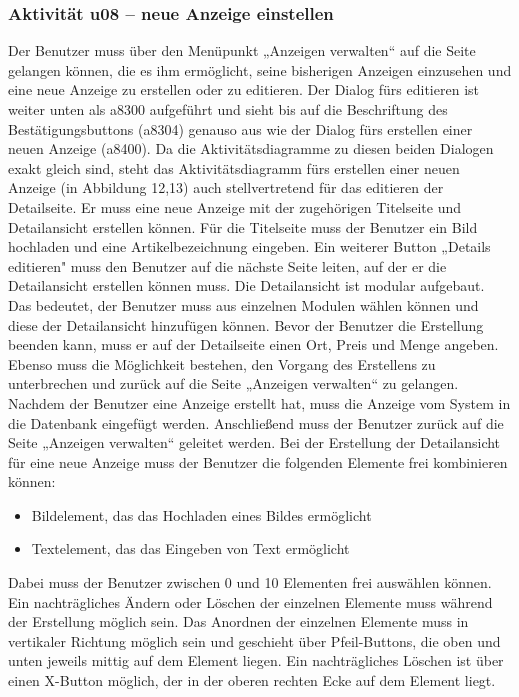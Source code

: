 \documentclass[a4paper,12pt,oneside]{scrartcl}
\begin{document}
\hypertarget{u08}{\subsubsection{Aktivität u08 – neue Anzeige einstellen}}
Der Benutzer muss über den Menüpunkt „Anzeigen verwalten“ auf die Seite gelangen können, die es ihm ermöglicht, seine bisherigen Anzeigen einzusehen und eine neue Anzeige zu erstellen oder zu editieren.
Der Dialog fürs editieren ist weiter unten als a8300 aufgeführt und sieht bis auf die Beschriftung des Bestätigungsbuttons (a8304) genauso aus wie der Dialog fürs erstellen einer neuen Anzeige (a8400). Da die Aktivitätsdiagramme zu diesen beiden Dialogen exakt gleich sind, steht das Aktivitätsdiagramm fürs erstellen einer neuen Anzeige (in Abbildung 12,13) auch stellvertretend für das editieren der Detailseite.
Er muss eine neue Anzeige mit der zugehörigen Titelseite und Detailansicht erstellen können.
Für die Titelseite muss der Benutzer ein Bild hochladen und eine Artikelbezeichnung eingeben.
Ein weiterer Button „Details editieren" muss den Benutzer auf die nächste Seite leiten, auf der er die Detailansicht erstellen können muss.
Die Detailansicht ist modular aufgebaut. Das bedeutet, der Benutzer muss aus einzelnen Modulen wählen können und diese der Detailansicht hinzufügen können.
Bevor der Benutzer die Erstellung beenden kann, muss er auf der Detailseite einen Ort, Preis und Menge angeben.
Ebenso muss die Möglichkeit bestehen, den Vorgang des Erstellens zu unterbrechen und zurück auf die Seite „Anzeigen verwalten“ zu gelangen.
Nachdem der Benutzer eine Anzeige erstellt hat, muss die Anzeige vom System in die Datenbank eingefügt werden.
Anschließend muss der Benutzer zurück auf die Seite „Anzeigen verwalten“ geleitet werden.
Bei der Erstellung der Detailansicht für eine neue Anzeige muss der Benutzer die folgenden Elemente frei kombinieren können:

\begin{itemize}
	\item Bildelement, das das Hochladen eines Bildes ermöglicht
	\item Textelement, das das Eingeben von Text ermöglicht
\end{itemize}
Dabei muss der Benutzer zwischen 0 und 10 Elementen frei auswählen können.
Ein nachträgliches Ändern oder Löschen der einzelnen Elemente muss während der Erstellung möglich sein.
Das Anordnen der einzelnen Elemente muss in vertikaler Richtung möglich sein und geschieht über Pfeil-Buttons, die oben und unten jeweils mittig auf dem Element liegen.
Ein nachträgliches Löschen ist über einen X-Button möglich, der in der oberen rechten Ecke auf dem Element liegt.
\end{document}
